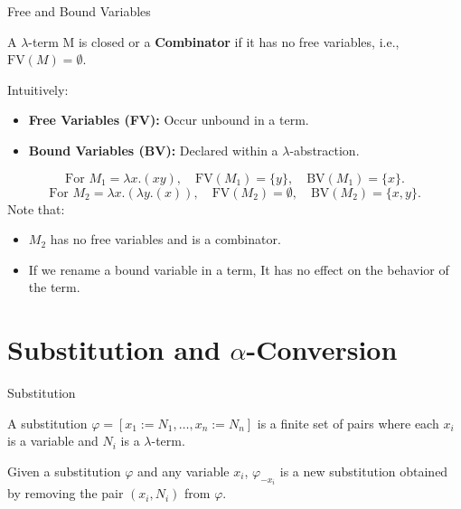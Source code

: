 \documentclass{beamer}
\begin{document}
\begin{frame}{Free and Bound Variables}

  \begin{definition}
    A $\lambda$-term M is closed or a \textbf{Combinator} if it has no free variables, i.e., $\text{FV}(M) = \emptyset$.
  \end{definition}

  Intuitively:
  \begin{itemize}
    \item \textbf{Free Variables (FV):} Occur unbound in a term.
    \item \textbf{Bound Variables (BV):} Declared within a $\lambda$-abstraction.
  \end{itemize}
  \vspace{1em}
  \[
  \text{For } M_1 = \lambda x. (xy), \quad \text{FV}(M_1)=\{y\},\quad \text{BV}(M_1)=\{x\}.
  \]
  \[
  \text{For } M_2 = \lambda x.(\lambda y. (x)), \quad \text{FV}(M_2)=\emptyset,\quad \text{BV}(M_2)=\{x,y\}.
  \]
  Note that:
  \begin{itemize}
    \item \(M_2\) has no free variables and is a combinator.
    \item If we rename a bound variable in a term, It has no effect on the behavior of the term.
  \end{itemize}
\end{frame}



\section{Substitution and $\alpha$-Conversion}

\begin{frame}{Substitution}


\begin{definition}
  A substitution $\varphi = [x_1 := N_1, \ldots, x_n := N_n]$ is a finite set of pairs where each \(x_i\) is a variable and \(N_i\) is a $\lambda$-term.\\
\end{definition}
\begin{definition}
  Given a substitution \(\varphi\) and any variable \(x_i\), \(\varphi_{-x_i}\) is a new substitution obtained by removing the pair \((x_i, N_i)\) from \(\varphi\).\\
\end{definition}


\end{frame}
\end{document}
